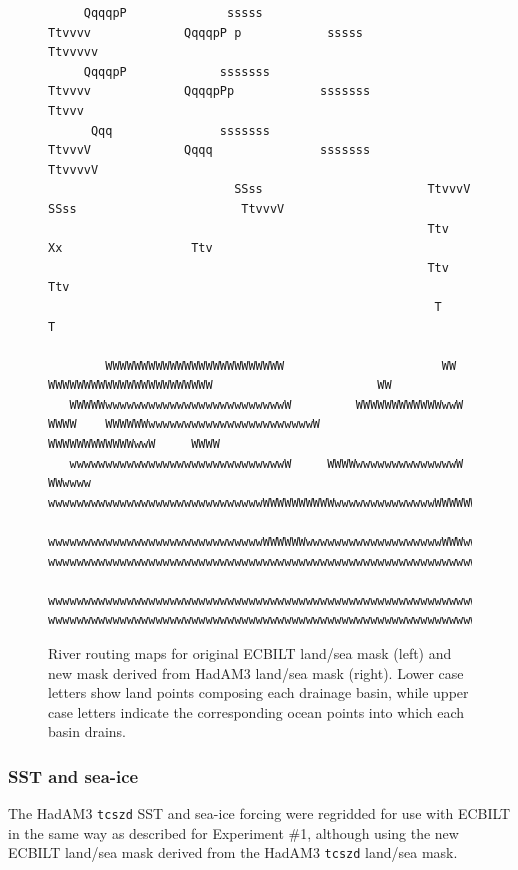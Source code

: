 \documentclass[a4paper,11pt]{article}
\begin{document}
\begin{figure}
\begin{verbatim}
     QqqqpP              sssss                        Ttvvvv             QqqqpP p            sssss                        Ttvvvvv
     QqqqpP             sssssss                       Ttvvvv             QqqqpPp            sssssss                       Ttvvv
      Qqq               sssssss                       TtvvvV             Qqqq               sssssss                      TtvvvvV
                          SSss                       TtvvvV                                   SSss                       TtvvvV
                                                     Ttv                                             Xx                  Ttv
                                                     Ttv                                                                 Ttv
                                                      T                                                                   T

        WWWWWWWWWWWWWWWWWWWWWWWWW                      WW                    WWWWWWWWWWWWWWWWWWWWWWW                       WW
   WWWWWwwwwwwwwwwwwwwwwwwwwwwwwwW         WWWWWWWWWWWWwwW     WWWW    WWWWWWwwwwwwwwwwwwwwwwwwwwwwwW          WWWWWWWWWWWWwwW     WWWW
   wwwwwwwwwwwwwwwwwwwwwwwwwwwwwwW     WWWWwwwwwwwwwwwwwwW   WWwwww    wwwwwwwwwwwwwwwwwwwwwwwwwwwwwwWWWWWWWWWWwwwwwwwwwwwwwwWWWWWWwwww
   wwwwwwwwwwwwwwwwwwwwwwwwwwwwwwWWWWWWwwwwwwwwwwwwwwwwwwwWWWwwwwww    wwwwwwwwwwwwwwwwwwwwwwwwwwwwwwwwwwwwwwwwwwwwwwwwwwwwwwwwwwwwwwww
   wwwwwwwwwwwwwwwwwwwwwwwwwwwwwwwwwwwwwwwwwwwwwwwwwwwwwwwwwwwwwwww    wwwwwwwwwwwwwwwwwwwwwwwwwwwwwwwwwwwwwwwwwwwwwwwwwwwwwwwwwwwwwwww
\end{verbatim}
\caption{River routing maps for original ECBILT land/sea mask (left)
  and new mask derived from HadAM3 land/sea mask (right).  Lower case
  letters show land points composing each drainage basin, while upper
  case letters indicate the corresponding ocean points into which each
  basin drains.}
\label{fig:river-routing}
\end{figure}

\subsubsection{SST and sea-ice}

The HadAM3 \texttt{tcszd} SST and sea-ice forcing were regridded for
use with ECBILT in the same way as described for Experiment \#1,
although using the new ECBILT land/sea mask derived from the HadAM3
\texttt{tcszd} land/sea mask.

\end{document}
